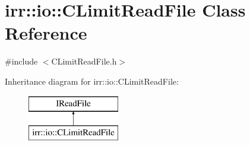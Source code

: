 \hypertarget{classirr_1_1io_1_1_c_limit_read_file}{\section{irr\-:\-:io\-:\-:C\-Limit\-Read\-File Class Reference}
\label{classirr_1_1io_1_1_c_limit_read_file}
}


{\ttfamily \#include $<$C\-Limit\-Read\-File.\-h$>$}

Inheritance diagram for irr\-:\-:io\-:\-:C\-Limit\-Read\-File\-:\begin{figure}[H]
\begin{center}
\leavevmode
\includegraphics[height=2.000000cm]{classirr_1_1io_1_1_c_limit_read_file}
\end{center}
\end{figure}
